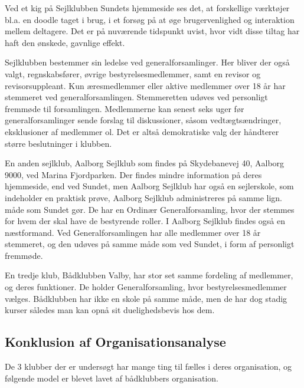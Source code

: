Ved et kig på Sejlklubben Sundets hjemmeside \citep{SundetUdlaan} ses det, at forskellige værktøjer bl.a. en doodle
taget i brug, i et forsøg på at øge brugervenlighed og interaktion mellem deltagere. Det er på nuværende tidspunkt
uvist, hvor vidt disse tiltag har haft den ønskede, gavnlige effekt.

Sejlklubben bestemmer sin ledelse ved generalforsamlinger. Her bliver der også valgt, regnskabsfører, øvrige
bestyrelsesmedlemmer, samt en revisor og revisorsuppleant. Kun æresmedlemmer eller aktive medlemmer over 18 år har
stemmeret ved generalforsamlingen. Stemmeretten udøves ved personligt fremmøde til forsamlingen. Medlemmerne kan senest
seks uger før generalforsamlinger sende forslag til diskussioner, såsom vedtægtsændringer, eksklusioner af medlemmer ol.
Det er altså demokratiske valg der håndterer større beslutninger i klubben.

En anden sejlklub, Aalborg Sejlklub som findes på Skydebanevej 40, Aalborg 9000, ved Marina Fjordparken. Der findes
mindre information på deres hjemmeside, end ved Sundet, men Aalborg Sejlklub har også en sejlerskole, som indeholder en
praktisk prøve,  Aalborg Sejlklub administreres på samme lign. måde som Sundet gør. De har en
Ordinær Generalforsamling, hvor der stemmes for hvem der skal have de bestyrende roller. I Aalborg Sejlklub findes også en næstformand. Ved Generalforsamlingen har alle medlemmer over 18
år stemmeret, og den udøves på samme måde som ved Sundet, i form af personligt fremmøde.\citep{AalborgSejlklub}

En tredje klub, Bådklubben Valby, har stor set samme fordeling af medlemmer, og deres funktioner. De holder Generalforsamling, hvor bestyrelsesmedlemmer vælges. Bådklubben har ikke en skole på samme måde, men de har dog stadig kurser således man kan opnå sit duelighedsbevis hos dem.\citep{BaadklubbenValby}


\subsection{Konklusion af Organisationsanalyse}

De 3 klubber der er undersøgt har mange ting til fælles i deres organisation, og følgende model er blevet lavet af bådklubbers organisation. 


